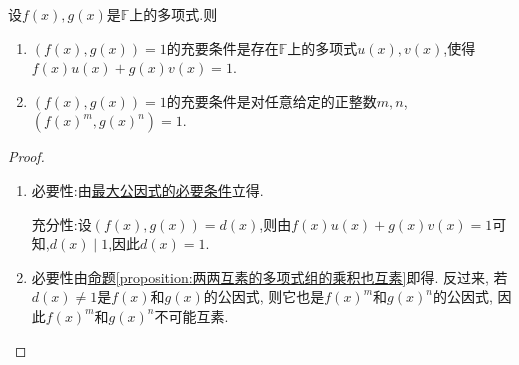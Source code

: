 \documentclass[../../main.tex]{subfiles}%
\begin{document}
\begin{theorem}[多项式互素的充要条件]\label{theorem:多项式互素的充要条件}
设\(f(x),g(x)\)是\(\mathbb{F}\)上的多项式.则
\begin{enumerate}[(1)]
\item \((f(x),g(x)) = 1\)的充要条件是存在\(\mathbb{F}\)上的多项式\(u(x),v(x)\),使得$f(x)u(x)+g(x)v(x)=1.$
\item \((f(x),g(x)) = 1\)的充要条件是对任意给定的正整数\(m,n\), \((f(x)^m,g(x)^n)=1\).
\end{enumerate}
\end{theorem}
\begin{proof}
\begin{enumerate}
\item 必要性:由\hyperref[theorem:最大公因式的必要条件]{最大公因式的必要条件}立得.

充分性:设$(f(x),g(x))=d(x)$,则由$f(x)u(x)+g(x)v(x)=1$可知,$d(x)\mid 1$,因此$d(x)=1.$

\item 必要性由\hyperref[proposition:两两互素的多项式组的乘积也互素]{命题\ref{proposition:两两互素的多项式组的乘积也互素}}即得. 反过来, 若\(d(x)\neq 1\)是\(f(x)\)和\(g(x)\)的公因式, 则它也是\(f(x)^m\)和\(g(x)^n\)的公因式, 因此\(f(x)^m\)和\(g(x)^n\)不可能互素.
\end{enumerate}

\end{proof}
\end{document}
